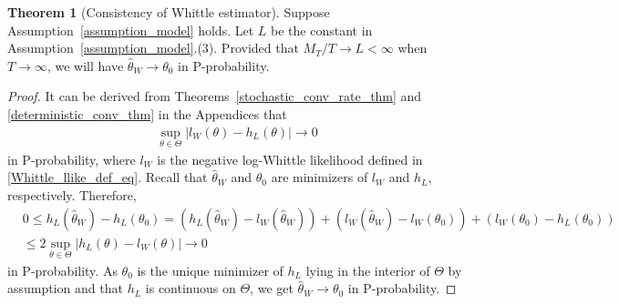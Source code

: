 \documentclass[11pt]{article}
\numberwithin{equation}{section}
\theoremstyle{plain}
\theoremstyle{definition}
\theoremstyle{definition}
\theoremstyle{assumption}
\theoremstyle{proposition}
\theoremstyle{proposition}
\theoremstyle{example}
\theoremstyle{lemma}
\theoremstyle{theorem}
\newtheorem{theorem}{Theorem}[section]
\theoremstyle{remark}
\begin{document}
\begin{theorem}[Consistency of Whittle estimator]\label{theorem_consistency_WE}
Suppose Assumption~\ref{assumption_model} holds. Let $L$ be the constant in Assumption~\ref{assumption_model}.(3). Provided that $M_T/T \rightarrow L < \infty$ when $T\rightarrow\infty$, we will have $\hat{\theta}_W \rightarrow\theta_0$ in $\mathrm{P}$-probability.
\begin{proof}
It can be derived from Theorems~\ref{stochastic_conv_rate_thm} and \ref{deterministic_conv_thm} in the Appendices that
\begin{align*}
\sup_{\theta\in\Theta}\left|l_{W}(\theta) - h_L(\theta)\right| \rightarrow 0
\end{align*}
in $\mathrm{P}$-probability, where $l_{W}$ is the negative log-Whittle likelihood defined in \eqref{Whittle_llike_def_eq}. Recall that $\hat{\theta}_W$ and $\theta_0$ are minimizers of $l_{W}$ and $h_L$, respectively. Therefore,
\begin{align*}
&0 \leqslant h_L(\hat{\theta}_W) - h_L(\theta_0)
= (h_L(\hat{\theta}_W) - l_W(\hat{\theta}_W)) + (l_W(\hat{\theta}_W) - l_{W}(\theta_0)) + (l_{W}(\theta_0) - h_L(\theta_0))  \\
&\leqslant 2\sup_{\theta\in\Theta}\left|h_L(\theta) - l_{W}(\theta)\right|\rightarrow 0
\end{align*}
in $\mathrm{P}$-probability. As $\theta_0$ is the unique minimizer of $h_L$ lying in the interior of $\Theta$ by assumption and that $h_L$ is continuous on $\Theta$, we get $\hat{\theta}_W \rightarrow\theta_0$ in $\mathrm{P}$-probability.
\end{proof}
\end{theorem}
\end{document}

